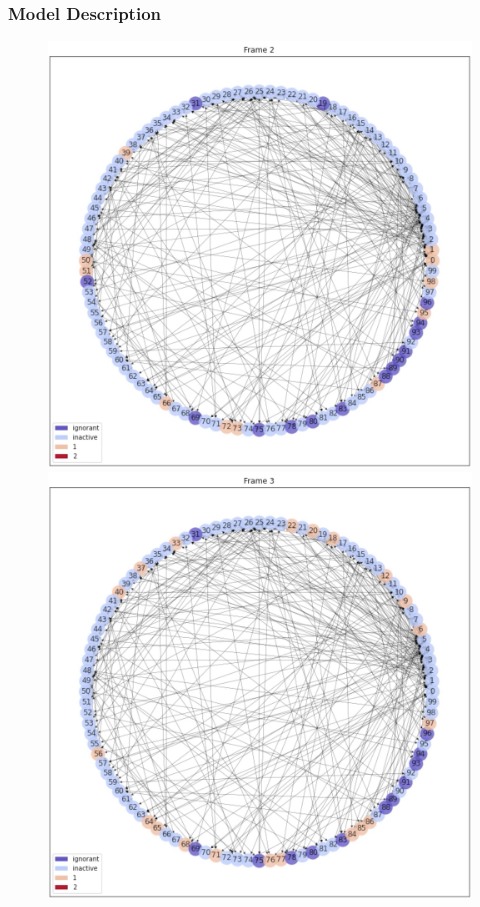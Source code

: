 \documentclass{beamer}
\begin{document}
\begin{frame}
\frametitle{Model Description}

\begin{center}
\begin{figure}
\includegraphics[scale=0.2]{images/frame2.png}
\includegraphics[scale=0.2]{images/frame3.png}
\end{figure}
\end{center}

\end{frame}
\end{document}
